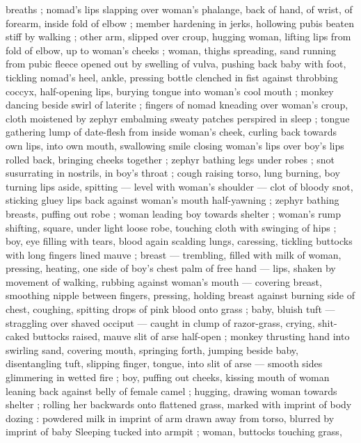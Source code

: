 breaths ; nomad's lips slapping over woman's phalange, back of 
hand, of wrist, of forearm, inside fold of elbow ; member hardening 
in jerks, hollowing pubis beaten stiff by walking ; other arm, slipped 
over croup, hugging woman, lifting lips from fold of elbow, up to 
woman's cheeks ; woman, thighs spreading, sand running from pubic 
fleece opened out by swelling of vulva, pushing back baby with foot, 
tickling nomad's heel, ankle, pressing bottle clenched in fist against 
throbbing coccyx, half-opening lips, burying tongue into woman's 
cool mouth ; monkey dancing beside swirl of laterite ; fingers of 
nomad kneading over woman's croup, cloth moistened by zephyr 
embalming sweaty patches perspired in sleep ; tongue gathering 
lump of date-flesh from inside woman's cheek, curling back towards 
own lips, into own mouth, swallowing {\col} smile closing woman's lips 
over boy's lips rolled back, bringing cheeks together ; zephyr bathing 
legs under robes ; snot susurrating in nostrils, in boy's throat ; cough 
raising torso, lung burning, boy turning lips aside, spitting --- level 
with woman's shoulder --- clot of bloody snot, sticking gluey lips 
back against woman's mouth half-yawning ; zephyr bathing breasts, 
puffing out robe ; woman leading boy towards shelter ; woman's 
rump shifting, square, under light loose robe, touching cloth with 
swinging of hips ; boy, eye filling with tears, blood again scalding 
lungs, caressing, tickling buttocks with long fingers lined mauve ; 
breast --- trembling, filled with milk {\dashcol} of woman, pressing, heating, 
one side of boy's chest {\col} palm of free hand --- lips, shaken by 
movement of walking, rubbing against woman's mouth --- covering 
breast, smoothing nipple between fingers, pressing, holding breast 
against burning side of chest, coughing, spitting drops of pink blood 
onto grass ; baby, bluish tuft --- straggling over shaved occiput --- 
caught in clump of razor-grass, crying, shit-caked buttocks raised, 
mauve slit of arse half-open ; monkey thrusting hand into swirling 
sand, covering mouth, springing forth, jumping beside baby, 
disentangling tuft, slipping finger, tongue, into slit of arse --- smooth 
sides glimmering in wetted fire ; boy, puffing out cheeks, kissing 
mouth of woman leaning back against belly of female camel ; 
hugging, drawing woman towards shelter ; rolling her backwards onto 
flattened grass, marked with imprint of body dozing : powdered milk 
in imprint of arm drawn away from torso, blurred by imprint of baby 
Sleeping tucked into armpit ; woman, buttocks touching grass, 
